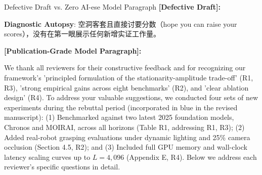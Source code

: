 \begin{ExampleBox}{Defective Draft vs. Zero AI-ese Model Paragraph}
\textbf{\color{TargetHighlight}[Defective Draft]:}\par
{}\par\vspace{4pt}
\textbf{Diagnostic Autopsy}: 空洞客套且直接讨要分数（hope you can raise your scores），没有在第一眼展示任何新增实证工作量。\par\vspace{6pt}
\textbf{\color{AcadNavy}[Publication-Grade Model Paragraph]:}\par
We thank all reviewers for their constructive feedback and for recognizing our framework's 'principled formulation of the stationarity-amplitude trade-off' (R1, R3), 'strong empirical gains across eight benchmarks' (R2), and 'clear ablation design' (R4). To address your valuable suggestions, we conducted four sets of new experiments during the rebuttal period (incorporated in blue in the revised manuscript): (1) Benchmarked against two latest 2025 foundation models, Chronos and MOIRAI, across all horizons (Table R1, addressing R1, R3); (2) Added real-robot grasping evaluations under dynamic lighting and 25\% camera occlusion (Section 4.5, R2); and (3) Included full GPU memory and wall-clock latency scaling curves up to $L=4,096$ (Appendix E, R4). Below we address each reviewer's specific questions in detail.
\end{ExampleBox}
